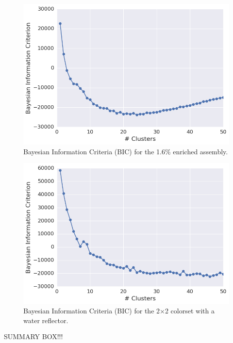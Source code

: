 \begin{figure}[h!]
\centering
\includegraphics[width=0.87\linewidth]{figures/results/model-select/assm-16/bic-combined-U238-capture-1}
\vspace{2mm}
\caption[Silhouette coefficients for the 1.6\% enriched assembly]{Bayesian Information Criteria (BIC) for the 1.6\% enriched assembly.}
\label{fig:chap11-assm-16-bic}
\end{figure}

\begin{figure}[h!]
\centering
\includegraphics[width=0.87\linewidth]{figures/results/model-select/reflector/bic-combined-U238-nu-fission-1}
\vspace{2mm}
\caption[BIC for the 2$\times$2 colorset with reflector]{Bayesian Information Criteria (BIC) for the 2$\times$2 colorset with a water reflector.}
\label{fig:chap11-refl-bic}
\end{figure}

SUMMARY BOX!!!

